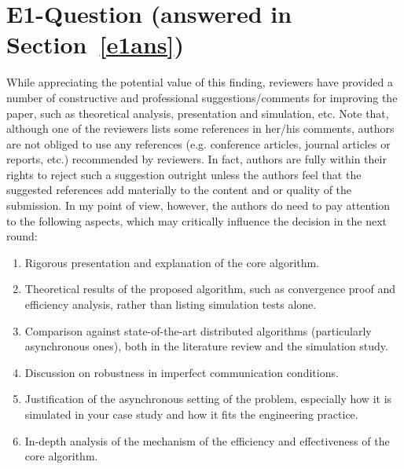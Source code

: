 \documentclass[11pt]{article}
\newcommand{\sect}[1]{\textbf{Section}~\ref{#1}}
\begin{document}
\section{E1-Question (answered in \sect{e1ans})}
While appreciating the potential value of this finding, reviewers have provided a number of constructive and professional suggestions/comments for improving the paper, such as theoretical analysis, presentation and simulation, etc. Note that, although one of the reviewers lists some references in her/his comments, authors are not obliged to use any references (e.g. conference articles, journal articles or reports, etc.) recommended by reviewers. In fact, authors are fully within their rights to reject such a suggestion outright unless the authors feel that the suggested references add materially to the content and or quality of the submission. In my point of view, however, the authors do need to pay attention to the following aspects, which may critically influence the decision in the next round:
\begin{enumerate}
    \item Rigorous presentation and explanation of the core algorithm.
    \item Theoretical results of the proposed algorithm, such as convergence proof and efficiency analysis, rather than listing simulation tests alone.
    \item Comparison against state-of-the-art distributed algorithms (particularly asynchronous ones), both in the literature review and the simulation study.
    \item Discussion on robustness in imperfect communication conditions.
    \item Justification of the asynchronous setting of the problem, especially how it is simulated in your case study and how it fits the engineering practice.
    \item In-depth analysis of the mechanism of the efficiency and effectiveness of the core algorithm.
\end{enumerate}
\end{document}
